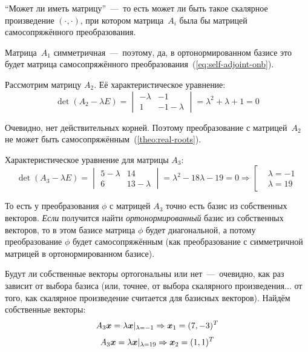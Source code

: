 \documentclass[a4paper,12pt]{article}
\theoremstyle{remark}
\begin{document}
  \begin{solution}
    ``Может ли иметь матрицу''~---~то есть может ли быть такое скалярное произведение $(\cdot, \cdot)$, при котором матрица~$A_i$ была бы матрицей самосопряжённого преобразования.
    
    Матрица~$A_1$ симметричная~---~поэтому, да, в ортонормированном базисе это будет матрица самосопряжённого преобразования~(\ref{eq:self-adjoint-onb}).
    
    Рассмотрим матрицу $A_2$.
    Её характеристическое уравнение:
    \[
      \det(A_2 - \lambda E) = \begin{vmatrix}
        -\lambda & -1\\
        1 & -1 - \lambda
      \end{vmatrix} = \lambda^2 + \lambda + 1 = 0
    \]
    
    Очевидно, нет действительных корней.
    Поэтому преобразование с матрицей~$A_2$ не может быть самосопряжённым~(\ref{theo:real-roots}).
    
    \medskip
    
    Характеристическое уравнение для матрицы $A_3$:
    \[
      \det(A_3 - \lambda E) = \begin{vmatrix}
        5 - \lambda & 14\\
        6 & 13 - \lambda
      \end{vmatrix} = \lambda^2 - 18\lambda - 19 = 0
      \Rightarrow \left[
        \begin{aligned}
          &\lambda = -1\\
          &\lambda = 19
        \end{aligned}
      \right.
    \]
    
    То есть у преобразования $\phi$ с матрицей $A_3$ точно есть базис из собственных векторов.
    \emph{Если} получится найти \emph{ортонормированный} базис из собственных векторов, то в этом базисе матрица $\phi$ будет диагональной, а потому преобразование $\phi$ будет самосопряжённым (как преобразование с симметричной матрицей в ортонормированном базисе).
    
    Будут ли собственные векторы ортогональны или нет~---~очевидно, как раз зависит от выбора базиса (или, точнее, от выбора скалярного произведения... от того, как скалярное произведение считается для базисных векторов).
    Найдём собственные векторы:
    \[
      A_3 \boldsymbol x = \lambda \boldsymbol x|_{\lambda = -1} \Rightarrow \boldsymbol x_1 = (7, -3)^T
    \]
    \[
      A_3 \boldsymbol x = \lambda \boldsymbol x|_{\lambda = 19} \Rightarrow \boldsymbol x_2 = (1, 1)^T
    \]
    

\end{solution}
\end{document}
